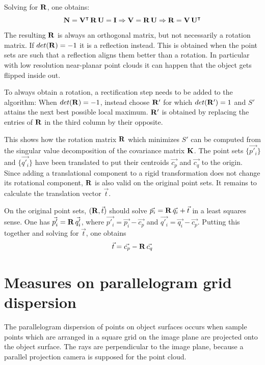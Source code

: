 Solving for $\mathbf{R}$, one obtains:
\begin{equation}
\mathbf{N} = \mathbf{V}^\intercal \, \mathbf{R} \, \mathbf{U} = \mathbf{I}
\Rightarrow \mathbf{V} = \mathbf{R} \, \mathbf{U}
\Rightarrow \mathbf{R} = \mathbf{V} \, \mathbf{U}^\intercal
\end{equation}
The resulting $\mathbf{R}$ is always an orthogonal matrix, but not necessarily a rotation matrix. If $det(\mathbf{R}) = -1$ it is a reflection instead. This is obtained when the point sets are such that a reflection aligns them better than a rotation. In particular with low resolution near-planar point clouds it can happen that the object gets flipped inside out.

To always obtain a rotation, a rectification step needs to be added to the algorithm: When $det(\mathbf{R}) = -1$, instead choose $\mathbf{R'}$ for which $det(\mathbf{R'}) = 1$ and $S'$ attains the next best possible local maximum. $\mathbf{R'}$ is obtained by replacing the entries of $\mathbf{R}$ in the third column by their opposite.

This shows how the rotation matrix $\mathbf{R}$ which minimizes $S'$ can be computed from the singular value decomposition of the covariance matrix $\mathbf{K}$. The point sets $\{ \vec{p'_i} \}$ and $\{ \vec{q'_i} \}$ have been translated to put their centroids $\vec{c_p}$ and $\vec{c_q}$ to the origin. Since adding a translational component to a rigid transformation does not change its rotational component, $\mathbf{R}$ is also valid on the original point sets. It remains to calculate the translation vector $\vec{t}$.

On the original point sets, $(\mathbf{R}, \vec{t})$ should solve $\vec{p_i} = \mathbf{R} \, \vec{q_i} + \vec{t}$ in a least squares sense. One has $\vec{p'_i} = \mathbf{R} \, \vec{q'_i}$, where $\vec{p'_i} = \vec{p_i} - \vec{c_p}$ and $\vec{q'_i} = \vec{q_i} - \vec{c_p}$. Putting this together and solving for $\vec{t}$, one obtains
\begin{equation}
\vec{t} = \vec{c_p} - \mathbf{R} \, \vec{c_q}
\end{equation}


\section{Measures on parallelogram grid dispersion} \label{sec:proof_pargrid_measures}
The parallelogram dispersion of points on object surfaces occurs when sample points which are arranged in a square grid on the image plane are projected onto the object surface. The rays are perpendicular to the image plane, because a parallel projection camera is supposed for the point cloud.  

